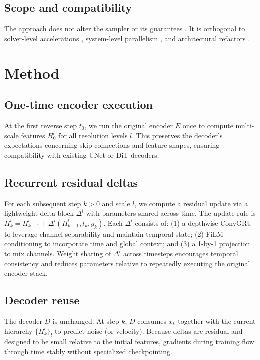 \documentclass{article}
\begin{document}
\subsection{Scope and compatibility}
The approach does not alter the sampler or its guarantees \cite{chen-2023-the,chen-2022-improved}. It is orthogonal to solver-level accelerations \cite{huang-2024-reverse}, system-level parallelism \cite{li-2024-distrifusion}, and architectural refactors \cite{yan-2023-diffusion,phung-2022-wavelet}.

\section{Method}
\subsection{One-time encoder execution}
At the first reverse step $t_0$, we run the original encoder $E$ once to compute multi-scale features $H_0^l$ for all resolution levels $l$. This preserves the decoder’s expectations concerning skip connections and feature shapes, ensuring compatibility with existing UNet or DiT decoders.

\subsection{Recurrent residual deltas}
For each subsequent step $k>0$ and scale $l$, we compute a residual update via a lightweight delta block $\Delta^l$ with parameters shared across time. The update rule is $H_k^l = H_{k-1}^l + \Delta^l(H_{k-1}^l, t_k, g_k)$. Each $\Delta^l$ consists of: (1) a depthwise ConvGRU to leverage channel separability and maintain temporal state; (2) FiLM conditioning to incorporate time and global context; and (3) a 1-by-1 projection to mix channels. Weight sharing of $\Delta^l$ across timesteps encourages temporal consistency and reduces parameters relative to repeatedly executing the original encoder stack.

\subsection{Decoder reuse}
The decoder $D$ is unchanged. At step $k$, $D$ consumes $x_k$ together with the current hierarchy $\{H_k^l\}_l$ to predict noise (or velocity). Because deltas are residual and designed to be small relative to the initial features, gradients during training flow through time stably without specialized checkpointing.
\end{document}
